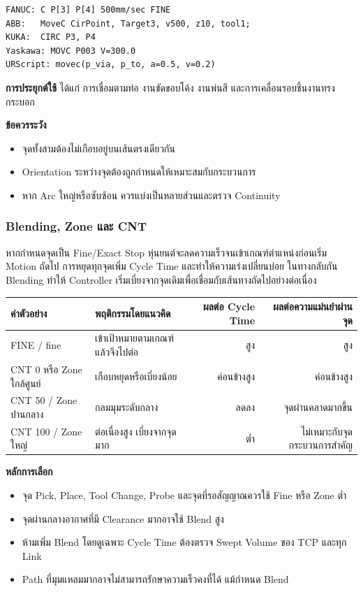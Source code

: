 \begin{verbatim}
FANUC: C P[3] P[4] 500mm/sec FINE
ABB:   MoveC CirPoint, Target3, v500, z10, tool1;
KUKA:  CIRC P3, P4
Yaskawa: MOVC P003 V=300.0
URScript: movec(p_via, p_to, a=0.5, v=0.2)
\end{verbatim}

\textbf{การประยุกต์ใช้} ได้แก่ การเชื่อมตามท่อ งานขัดขอบโค้ง งานพ่นสี และการเคลื่อนรอบชิ้นงานทรงกระบอก

\textbf{ข้อควรระวัง}

\begin{itemize}
    \item จุดทั้งสามต้องไม่เกือบอยู่บนเส้นตรงเดียวกัน
    \item Orientation ระหว่างจุดต้องถูกกำหนดให้เหมาะสมกับกระบวนการ
    \item หาก Arc ใหญ่หรือซับซ้อน ควรแบ่งเป็นหลายส่วนและตรวจ Continuity
\end{itemize}

\subsubsection{Blending, Zone และ CNT}

หากกำหนดจุดเป็น Fine/Exact Stop หุ่นยนต์จะลดความเร็วจนเข้าเกณฑ์ตำแหน่งก่อนเริ่ม Motion ถัดไป การหยุดทุกจุดเพิ่ม Cycle Time และทำให้ความเร่งเปลี่ยนบ่อย ในทางกลับกัน Blending ทำให้ Controller เริ่มเบี่ยงจากจุดเดิมเพื่อเชื่อมกับเส้นทางถัดไปอย่างต่อเนื่อง

\begin{table}[htbp]
    \centering
    \begin{tabular}{l l r r}
        \hline
        \textbf{ค่าตัวอย่าง} & \textbf{พฤติกรรมโดยแนวคิด} & \textbf{ผลต่อ Cycle Time} & \textbf{ผลต่อความแม่นยำผ่านจุด} \\
        \hline
        FINE / fine & เข้าเป้าหมายตามเกณฑ์แล้วจึงไปต่อ & สูง & สูง \\
        CNT 0 หรือ Zone ใกล้ศูนย์ & เกือบหยุดหรือเบี่ยงน้อย & ค่อนข้างสูง & ค่อนข้างสูง \\
        CNT 50 / Zone ปานกลาง & กลมมุมระดับกลาง & ลดลง & จุดผ่านคลาดมากขึ้น \\
        CNT 100 / Zone ใหญ่ & ต่อเนื่องสูง เบี่ยงจากจุดมาก & ต่ำ & ไม่เหมาะกับจุดกระบวนการสำคัญ \\
        \hline
    \end{tabular}
\end{table}

\textbf{หลักการเลือก}

\begin{itemize}
    \item จุด Pick, Place, Tool Change, Probe และจุดที่รอสัญญาณควรใช้ Fine หรือ Zone ต่ำ
    \item จุดผ่านกลางอากาศที่มี Clearance มากอาจใช้ Blend สูง
    \item ห้ามเพิ่ม Blend โดยดูเฉพาะ Cycle Time ต้องตรวจ Swept Volume ของ TCP และทุก Link
    \item Path ที่มุมแหลมมากอาจไม่สามารถรักษาความเร็วคงที่ได้ แม้กำหนด Blend
\end{itemize}

